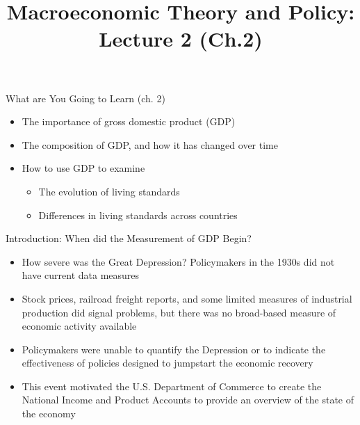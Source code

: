 \documentclass[aspectratio=1610]{beamer}
\title[Fall - Lecture 2] %
{Macroeconomic Theory and Policy: Lecture  2 (Ch.2)}
\author[University of Toronto] %
{}
\date[] %
\begin{document}
\begin{frame}
  \titlepage
\end{frame}

\begin{frame}[wide]{What are You Going to Learn (ch. 2)}
	\begin{itemize}
		\item The importance of gross domestic product (GDP)
		\item The composition of GDP, and how it has changed over time
		\item How to use GDP to examine
		\begin{itemize}
			\item The evolution of living standards
			\item Differences in living standards across countries
		\end{itemize}
	\end{itemize}
\end{frame}

\begin{frame}[wide]{Introduction: When did the Measurement of GDP Begin?}
	\begin{itemize}
		\item How severe was the Great Depression? Policymakers in the 1930s did not have current data measures
		\item Stock prices, railroad freight reports, and some limited measures of industrial production did signal problems, but there was no broad-based measure of economic activity available
		\item Policymakers were unable to quantify the Depression or to indicate the effectiveness of policies designed to jumpstart the economic recovery
		\item This event motivated the U.S. Department of Commerce to create the National Income and Product Accounts to provide an overview of the state of the economy
		
	\end{itemize}
\end{frame}

\end{document}
